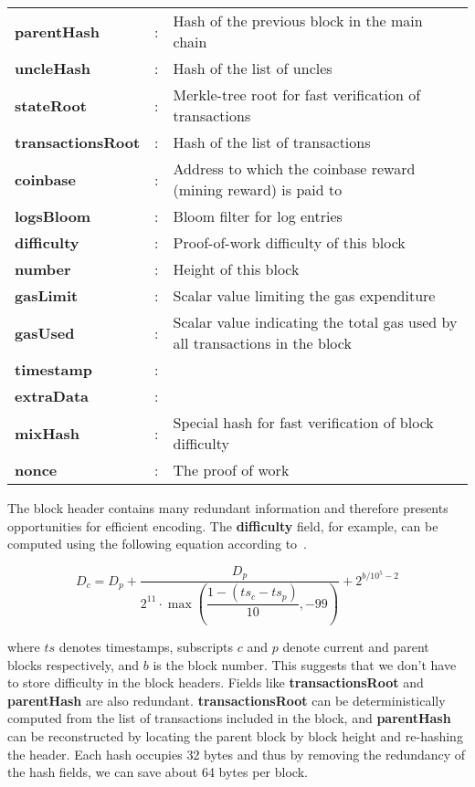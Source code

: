 \begin{table}[H]
	\centering
\begin{tabular}{>{\bfseries}l c l}
 parentHash&:& Hash of the previous block in the main chain\\
 uncleHash&:& Hash of the list of uncles\\
 stateRoot&:& Merkle-tree root for fast verification of transactions\\
 transactionsRoot&:& Hash of the list of transactions\\
 coinbase&:& Address to which the coinbase reward (mining reward) is paid to\\
 logsBloom&:& Bloom filter for log entries\\
 difficulty&:& Proof-of-work difficulty of this block\\
 number&:& Height of this block\\
 gasLimit&:& Scalar value limiting the gas expenditure\\
 gasUsed&:& Scalar value indicating the total gas used by all transactions in the block\\
 timestamp&:&\\
 extraData&:&\\
 mixHash&:& Special hash for fast verification of block difficulty\\
 nonce&:& The proof of work\\
\end{tabular}
\end{table}

The block header contains many redundant information and therefore presents opportunities for efficient encoding.
The \textbf{difficulty} field, for example, can be computed using the following equation according to~\cite{ethereum}.

$$
D_{c} = D_{p} + \dfrac{D_{p}}{2^{11}\cdot\max\left(\dfrac{1 - (ts_{c} - ts_{p})}{10}, -99\right)} + 2^{b/10^5-2}
$$

where $ts$ denotes timestamps, subscripts $c$ and $p$ denote current and parent blocks respectively, and $b$ is the block number.
This suggests that we don't have to store difficulty in the block headers.
Fields like \textbf{transactionsRoot} and \textbf{parentHash} are also redundant.
\textbf{transactionsRoot} can be deterministically computed from the list of transactions included in the block,
and \textbf{parentHash} can be reconstructed by locating the parent block by block height and re-hashing the header.
Each hash occupies  32 bytes and thus by removing the redundancy of the hash fields, we can save about 64 bytes per block.

